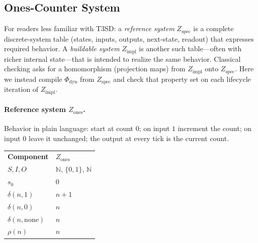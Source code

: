\subsection{Ones-Counter System}
\label{sec:case-ones}

For readers less familiar with T3SD: a \emph{reference system} $Z_{\text{spec}}$ is a complete discrete-system table (states, inputs, outputs, next-state, readout) that expresses required behavior. A \emph{buildable system} $Z_{\text{impl}}$ is another such table---often with richer internal state---that is intended to realize the same behavior. Classical checking asks for a homomorphism (projection maps) from $Z_{\text{impl}}$ onto $Z_{\text{spec}}$. Here we instead compile $\Phi_{\mathrm{dyn}}$ from $Z_{\text{spec}}$ and check that property set on each lifecycle iteration of $Z_{\text{impl}}$.

\paragraph{Reference system $Z_{\mathrm{ones}}$.}
Behavior in plain language: start at count $0$; on input $1$ increment the count; on input $0$ leave it unchanged; the output at every tick is the current count.

\begingroup
\renewcommand{\arraystretch}{1.25}
\footnotesize
\begin{center}
\begin{tabularx}{0.78\linewidth}{@{}>{\raggedright\arraybackslash}p{2.8cm}Y@{}}
    \headingfont\bfseries Component & \headingfont\bfseries $Z_{\mathrm{ones}}$ \\
    \addlinespace[2pt]
    $S,I,O$ & $\mathbb{N}$, $\{0,1\}$, $\mathbb{N}$ \\
    \addlinespace[2pt]
    $s_0$ & $0$ \\
    \addlinespace[2pt]
    $\delta(n,1)$ & $n+1$ \\
    \addlinespace[2pt]
    $\delta(n,0)$ & $n$ \\
    \addlinespace[2pt]
    $\delta(n,\mathrm{none})$ & $n$ \\
    \addlinespace[2pt]
    $\rho(n)$ & $n$ \\
\end{tabularx}
\end{center}
\label{tab:z-ones}
\endgroup
\vspace{4pt}

